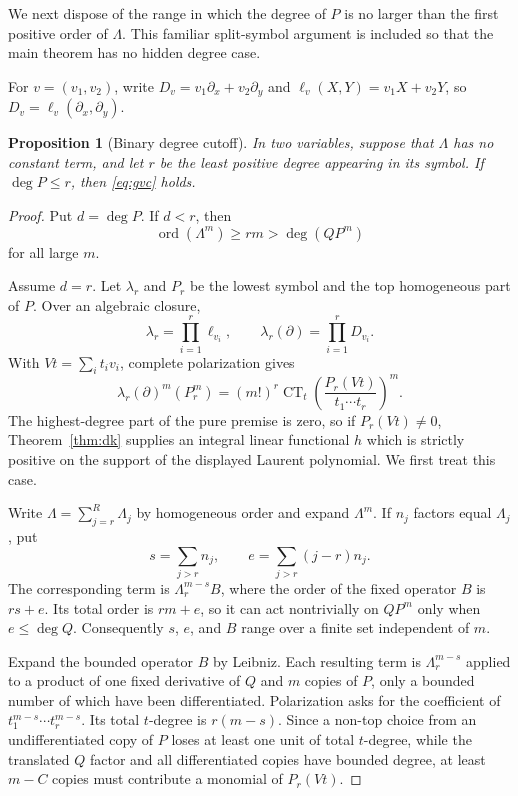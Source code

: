 \documentclass[11pt]{article}
\newtheorem{proposition}[theorem]{Proposition}
\newcommand{\CT}{\operatorname{CT}}
\begin{document}
We next dispose of the range in which the degree of $P$ is no larger than
the first positive order of $\Lambda$.  This familiar split-symbol argument
is included so that the main theorem has no hidden degree case.

For $v=(v_1,v_2)$, write $D_v=v_1\partial_x+v_2\partial_y$ and
$\ell_v(X,Y)=v_1X+v_2Y$, so $D_v=\ell_v(\partial_x,\partial_y)$.

\begin{proposition}[Binary degree cutoff]\label{prop:cutoff}
In two variables, suppose that $\Lambda$ has no constant term, and let $r$
be the least
positive degree appearing in its symbol.  If $\deg P\leq r$, then
\eqref{eq:gvc} holds.
\end{proposition}

\begin{proof}
Put $d=\deg P$.  If $d<r$, then
\[
 \operatorname{ord}(\Lambda^m)\geq rm>\deg(QP^m)
\]
for all large $m$.

Assume $d=r$.  Let $\lambda_r$ and $P_r$ be the lowest symbol and the top
homogeneous part of $P$.  Over an algebraic closure,
\[
 \lambda_r=\prod_{i=1}^r \ell_{v_i},
 \qquad \lambda_r(\partial)=\prod_{i=1}^r D_{v_i}.
\]
With $Vt=\sum_i t_iv_i$, complete polarization gives
\[
 \lambda_r(\partial)^m(P_r^m)
 =(m!)^r\CT_t\left(
       \frac{P_r(Vt)}{t_1\cdots t_r}
                  \right)^m.
\]
The highest-degree part of the pure premise is zero, so if $P_r(Vt)\ne0$,
Theorem~\ref{thm:dk} supplies an integral linear functional $h$ which is
strictly positive on the support of the displayed Laurent polynomial.  We
first treat this case.

Write $\Lambda=\sum_{j=r}^R\Lambda_j$ by homogeneous order and expand
$\Lambda^m$.  If $n_j$ factors equal $\Lambda_j$, put
\[
 s=\sum_{j>r}n_j,
 \qquad e=\sum_{j>r}(j-r)n_j.
\]
The corresponding term is $\Lambda_r^{m-s}B$, where the order of the fixed
operator $B$ is $rs+e$.  Its total order is $rm+e$, so it can act
nontrivially on $QP^m$ only when $e\leq\deg Q$.  Consequently $s$, $e$, and
$B$ range over a finite set independent of $m$.

Expand the bounded operator $B$ by Leibniz.  Each resulting term is
$\Lambda_r^{m-s}$ applied to a product of one fixed derivative of $Q$ and
$m$ copies of $P$, only a bounded number of which have been differentiated.
Polarization asks for the coefficient of
$t_1^{m-s}\cdots t_r^{m-s}$.  Its total $t$-degree is $r(m-s)$.  Since a
non-top choice from an undifferentiated copy of $P$ loses at least one unit
of total $t$-degree, while the translated $Q$ factor and all differentiated
copies have bounded degree, at least $m-C$ copies must contribute a monomial
of $P_r(Vt)$.


\end{proof}
\end{document}
